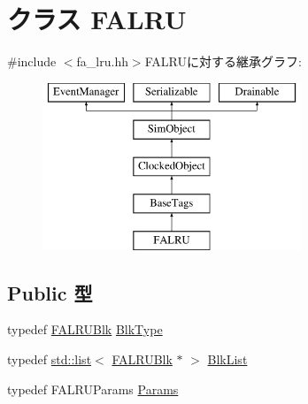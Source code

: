 \hypertarget{classFALRU}{
\section{クラス FALRU}
\label{classFALRU}
}


{\ttfamily \#include $<$fa\_\-lru.hh$>$}FALRUに対する継承グラフ:\begin{figure}[H]
\begin{center}
\leavevmode
\includegraphics[height=5cm]{classFALRU}
\end{center}
\end{figure}
\subsection*{Public 型}
\begin{DoxyCompactItemize}
\item 
typedef \hyperlink{classFALRUBlk}{FALRUBlk} \hyperlink{classFALRU_a484db1f477d317f6694973b77f1e3ab1}{BlkType}
\item 
typedef \hyperlink{classstd_1_1list}{std::list}$<$ \hyperlink{classFALRUBlk}{FALRUBlk} $\ast$ $>$ \hyperlink{classFALRU_ae5eda55657abbfe7eda0b6d87a1eb18f}{BlkList}
\item 
typedef FALRUParams \hyperlink{classFALRU_ac02f095611cbe1cc1b0d89ce95694168}{Params}
\end{DoxyCompactItemize}
